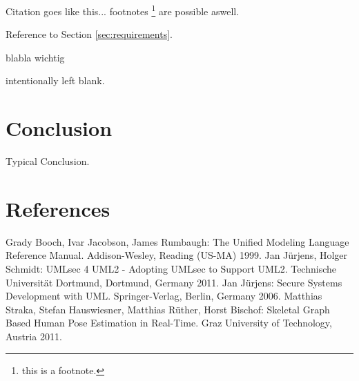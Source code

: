 \documentclass{acmtog} %
\begin{document}
Citation goes like this... \cite{SHRB11}
footnotes \footnote{this is a footnote.} are possible aswell.

Reference to Section \ref{sec:requirements}.

blabla wichtig

intentionally left blank.

\section{Conclusion}
\label{sec:conclusion}

Typical Conclusion.

\section{References}
\renewcommand{\section}[2]{}
\begin{raggedright}%
\begin{thebibliography}{X}
	 Grady Booch, Ivar Jacobson, James Rumbaugh: The Unified Modeling Language Reference Manual. Addison-Wesley, Reading (US-MA) 1999.
	 Jan Jürjens, Holger Schmidt: UMLsec 4 UML2 - Adopting UMLsec to Support UML2. Technische Universität Dortmund, Dortmund, Germany 2011.
	 Jan Jürjens: Secure Systems Development with UML. Springer-Verlag, Berlin, Germany 2006.
	 Matthias Straka, Stefan Hauswiesner, Matthias Rüther, Horst Bischof: Skeletal Graph Based Human Pose Estimation in Real-Time. Graz University of Technology, Austria 2011.
\end{thebibliography}
\end{raggedright}
\end{document}
